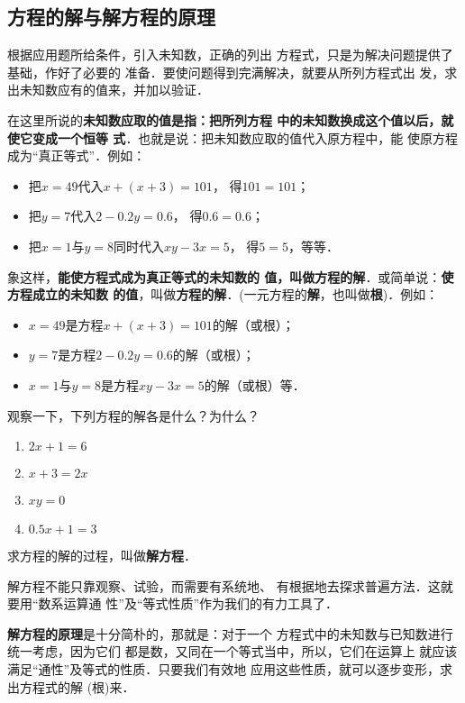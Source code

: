 \subsection{方程的解与解方程的原理}
    根据应用题所给条件，引入未知数，正确的列出
方程式，只是为解决问题提供了基础，作好了必要的
准备．要使问题得到完满解决，就要从所列方程式出
发，求出未知数应有的值来，并加以验证．

    在这里所说的\textbf{未知数应取的值是指：把所列方程
中的未知数换成这个值以后，就使它变成一个恒等
式}．也就是说：把未知数应取的值代入原方程中，能
使原方程成为“真正等式”．例如：
\begin{itemize}
    \item 把$x = 49$代入$x+ (x+3)=101$，    得$101=101$；
    \item 把$y=7$代入$2-0.2y=0.6$，    得$0 .6=0. 6$；
    \item 把$x=1$与$y=8$同时代入$xy-3x=5$，    得$5=5$，等等．
\end{itemize}
  
象这样，\textbf{能使方程式成为真正等式的未知数的
值，叫做方程的解}．或简单说：\textbf{使方程成立的未知数
的值}，叫做\textbf{方程的解}．(一元方程的\textbf{解}，也叫做\textbf{根})．例如：
\begin{itemize}
    \item $x = 49$是方程$x+ (x+3)=101$的解（或根）；
    \item $y=7$是方程$2-0.2y=0.6$的解（或根）；
    \item $x=1$与$y=8$是方程$xy-3x=5$的解（或根）等．
\end{itemize}


\begin{ex}
    观察一下，下列方程的解各是什么？为什么？
    \begin{multicols}{2}
        \begin{enumerate}
 \item $2x+1=6$
 \item $x+3=2x$
 \item $xy=0$
 \item $0.5x+1=3$           
        \end{enumerate}
    \end{multicols}
\end{ex}

求方程的解的过程，叫做\textbf{解方程}．

解方程不能只靠观察、试验，而需要有系统地、
有根据地去探求普遍方法．这就要用“数系运算通
性”及“等式性质”作为我们的有力工具了．

\textbf{解方程的原理}是十分简朴的，那就是：对于一个
方程式中的未知数与已知数进行统一考虑，因为它们
都是数，又同在一个等式当中，所以，它们在运算上
就应该满足“通性”及等式的性质．只要我们有效地
应用这些性质，就可以逐步变形，求出方程式的解
(根)来．

